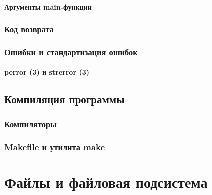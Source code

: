 \documentclass[oneside]{book}
\begin{document}
			\subsection{Аргументы main-функции}
			
		
		\section{Код возврата}
		
		
		\section{Ошибки и стандартизация ошибок}
		
		
			\subsection{perror (3) и strerror (3)}
			
		
	\chapter{Компиляция программы}
	
	
		\section{Компиляторы}
		
	
		\section{Makefile и утилита make}
		
	
	

\part{Файлы и файловая подсистема}
%
	
\end{document}
